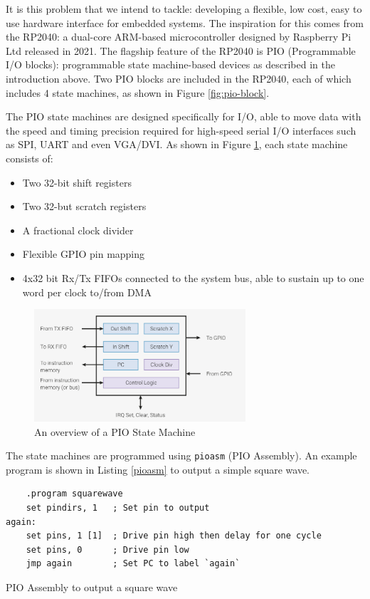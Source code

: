 \documentclass[a4paper,fleqn,12pt]{article}
\begin{document}
It is this problem that we intend to tackle: developing a flexible, low cost, easy to use hardware interface for embedded systems. The inspiration for this comes from the RP2040: a dual-core ARM-based microcontroller designed by Raspberry Pi Ltd released in 2021. The flagship feature of the RP2040 is PIO (Programmable I/O blocks): programmable state machine-based devices as described in the introduction above. Two PIO blocks are included in the RP2040, each of which includes 4 state machines, as shown in Figure \ref{fig:pio-block}.

The PIO state machines are designed specifically for I/O, able to move data with the speed and timing precision required for high-speed serial I/O interfaces such as SPI, UART and even VGA/DVI. As shown in Figure \ref{fig:pio-sm}, each state machine consists of:

\begin{itemize}
    \item Two 32-bit shift registers
    \item Two 32-but scratch registers
    \item A fractional clock divider
    \item Flexible GPIO pin mapping
    \item 4x32 bit Rx/Tx FIFOs connected to the system bus, able to sustain up to one word per clock to/from DMA
\end{itemize}

\begin{figure}[H]
    \centering
    \includegraphics[width=0.7\textwidth]{../img/rp2040-state-machine.png}
    \caption{An overview of a PIO State Machine \citep{rp2040}}
    \label{fig:pio-sm}
\end{figure}

The state machines are programmed using \texttt{pioasm} (PIO Assembly). An example program is shown in Listing \ref{pioasm} to output a simple square wave.

\begin{listing}[b]
    \vspace{0.5cm}
    \begin{verbatim}
    .program squarewave
    set pindirs, 1   ; Set pin to output
again:
    set pins, 1 [1]  ; Drive pin high then delay for one cycle
    set pins, 0      ; Drive pin low
    jmp again        ; Set PC to label `again`
    \end{verbatim}
    \caption{PIO Assembly to output a square wave \citep{rp2040}}
    \label{pioasm}
\end{listing}
\end{document}
